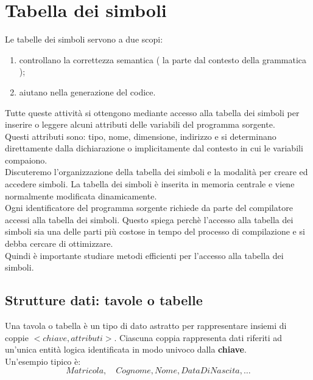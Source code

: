 \documentclass[12pt]{report}
\begin{document}
	\chapter{Tabella dei simboli}
	Le tabelle dei simboli servono a due scopi:
	\begin{enumerate}
		\item controllano la correttezza semantica ( la parte dal contesto della grammatica );
		\item aiutano nella generazione del codice.
	\end{enumerate}
	Tutte queste attività si ottengono mediante accesso alla tabella dei simboli per inserire o leggere alcuni attributi delle variabili del programma sorgente. \\
	Questi attributi sono: tipo, nome, dimensione, indirizzo e si determinano direttamente dalla dichiarazione o implicitamente dal contesto in cui le variabili compaiono. \\
	Discuteremo l'organizzazione della tabella dei simboli e la modalità per creare ed accedere simboli. La tabella dei simboli è inserita in memoria centrale e viene normalmente modificata dinamicamente. \\
	Ogni identificatore del programma sorgente richiede da parte del compilatore accessi alla tabella dei simboli. Questo spiega perchè l'accesso alla tabella dei simboli sia una delle parti più costose in tempo del processo di compilazione e si debba cercare di ottimizzare. \\
	Quindi è importante studiare metodi efficienti per l'accesso alla tabella dei simboli.
	\section{Strutture dati: tavole o tabelle}
	Una tavola o tabella è un tipo di dato astratto per rappresentare insiemi di coppie $<chiave, attributi>$. Ciascuna coppia rappresenta dati riferiti ad un'unica entità logica identificata in modo univoco dalla \textbf{chiave}. \\
	Un'esempio tipico è:
	\[
	Matricola, \quad Cognome, Nome, DataDiNascita, \dots
	\]
\end{document}
